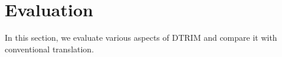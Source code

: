 \section{Evaluation}
\label{sec:evalation}

In this section, we evaluate various aspects of DTRIM and compare it
with conventional translation.

